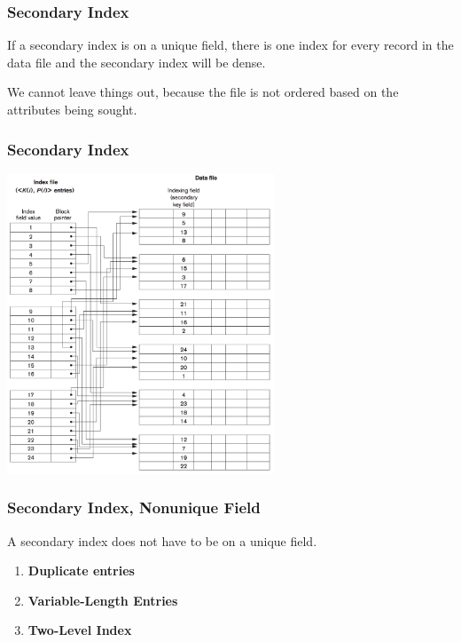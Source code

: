 \begin{frame}
\frametitle{Secondary Index}

If a secondary index is on a unique field, there is one index for every record in the data file and the secondary index will be dense. 

We cannot leave things out, because the file is not ordered based on the attributes being sought.
\end{frame}

\begin{frame}
\frametitle{Secondary Index}

\begin{center}
\includegraphics[width=0.6\textwidth]{images/secondary-index}
\end{center}


\end{frame}

\begin{frame}
\frametitle{Secondary Index, Nonunique Field}

A secondary index does not have to be on a unique field.

\begin{enumerate}
	\item \textbf{Duplicate entries}
	\item \textbf{Variable-Length Entries}	
	\item \textbf{Two-Level Index}
\end{enumerate}


\end{frame}


